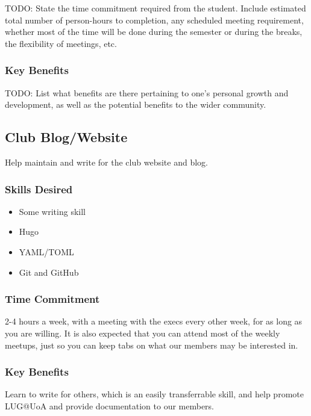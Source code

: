 \documentclass[11pt,fleqn]{article}
\begin{document}
TODO: State the time commitment required from the student.  Include estimated total number of person-hours to completion, any scheduled meeting requirement, whether most of the time will be done during the semester or during the breaks, the flexibility of meetings, etc.

\subsubsection*{Key Benefits}

TODO: List what benefits are there pertaining to one's personal growth and development, as well as the potential benefits to the wider community.

\newpage

\subsection{Club Blog/Website}

Help maintain and write for the club website and blog.

\subsubsection*{Skills Desired}

\begin{multicols}{2}
	\begin{itemize}
		\item Some writing skill
		\item Hugo
		\item YAML/TOML
		\item Git and GitHub
	\end{itemize}
\end{multicols}


\subsubsection*{Time Commitment}

2-4 hours a week, with a meeting with the execs every other week, for as long as you are willing. It is also expected that you can attend most of the weekly meetups, just so you can keep tabs on what our members may be interested in.

\subsubsection*{Key Benefits}

Learn to write for others, which is an easily transferrable skill, and help promote LUG@UoA and provide documentation to our members.
\end{document}
